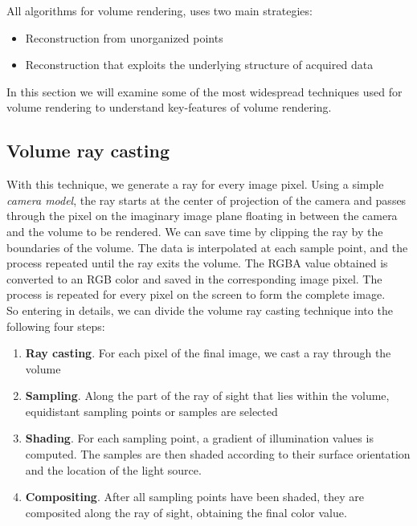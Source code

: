 All algorithms for volume rendering, uses two main strategies:
\begin{itemize}
 \item Reconstruction from unorganized points
 \item Reconstruction that exploits the underlying structure of acquired data
\end{itemize}

In this section we will examine some of the most widespread techniques used for volume rendering to understand key-features of volume rendering.

\subsection{Volume ray casting}

With this technique, we generate a ray for every image pixel. Using a simple \textit{camera model}, the ray starts at the center of projection of the camera and passes through the pixel on the imaginary image plane floating in between the camera and the volume to be rendered. We can save time by clipping the ray by the boundaries of the volume. The data is interpolated at each sample point, and the process repeated until the ray exits the volume. The RGBA value obtained is converted to an RGB color and saved in the corresponding image pixel. The process is repeated for every pixel on the screen to form the complete image.\\

So entering in details, we can divide the volume ray casting technique into the following four steps:
\begin{enumerate}
\item \textbf{Ray casting}. For each pixel of the final image, we cast a ray through the volume
\item \textbf{Sampling}. Along the part of the ray of sight that lies within the volume, equidistant sampling points or samples are selected
\item \textbf{Shading}. For each sampling point, a gradient of illumination values is computed. The samples are then shaded according to their surface orientation and the location of the light source.
\item \textbf{Compositing}. After all sampling points have been shaded, they are composited along the ray of sight, obtaining the final color value.
\end{enumerate}

